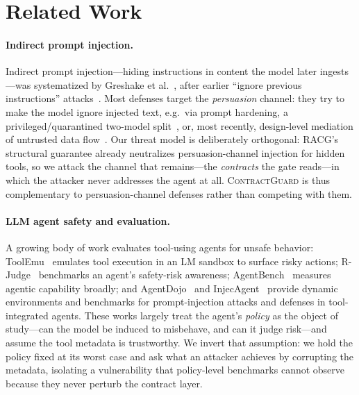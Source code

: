 \documentclass[conference,onecolumn]{IEEEtran}
\theoremstyle{definition}
\newcommand{\racg}{\textsc{RACG}}
\newcommand{\cg}{\textsc{ContractGuard}}
\begin{document}
\section{Related Work}
\label{sec:related}
\paragraph{Indirect prompt injection.}
Indirect prompt injection---hiding instructions in content the model later
ingests---was systematized by Greshake et al.~\cite{greshake2023injection}, after
earlier ``ignore previous instructions'' attacks~\cite{perez2022ignore}.
Most defenses target the \emph{persuasion} channel: they try to make the model
ignore injected text, e.g.\ via prompt hardening, a privileged/quarantined
two-model split~\cite{willison2023dual}, or, most recently, design-level
mediation of untrusted data flow~\cite{debenedetti2025camel}. Our threat model is
deliberately orthogonal: \racg's structural guarantee already neutralizes
persuasion-channel injection for hidden tools, so we attack the channel that
remains---the \emph{contracts} the gate reads---in which the attacker never
addresses the agent at all. \cg{} is thus complementary to persuasion-channel
defenses rather than competing with them.

\paragraph{LLM agent safety and evaluation.}
A growing body of work evaluates tool-using agents for unsafe behavior:
ToolEmu~\cite{ruan2024toolemu} emulates tool execution in an LM sandbox to surface
risky actions; R-Judge~\cite{tian2023rjudge} benchmarks an agent's safety-risk
awareness; AgentBench~\cite{liu2023agentbench} measures agentic capability
broadly; and AgentDojo~\cite{debenedetti2024agentdojo} and
InjecAgent~\cite{zhan2024injecagent} provide dynamic environments and benchmarks
for prompt-injection attacks and defenses in tool-integrated agents. These works
largely treat the agent's \emph{policy} as the object of study---can the model be
induced to misbehave, and can it judge risk---and assume the tool metadata is
trustworthy. We invert that assumption: we hold the policy fixed at its
worst case and ask what an attacker achieves by corrupting the metadata, isolating
a vulnerability that policy-level benchmarks cannot observe because they never
perturb the contract layer.
\end{document}
